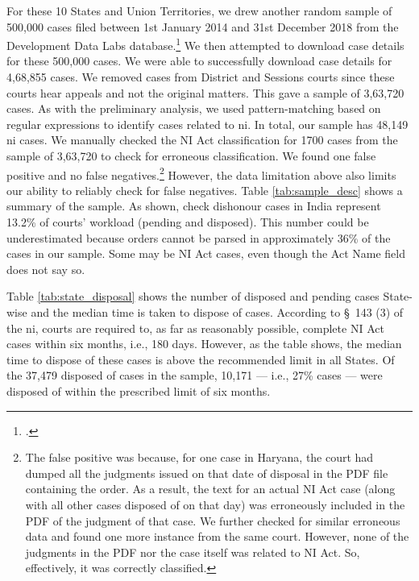 \documentclass[12pt,a4paper]{article}
\begin{document}
For these 10 States and Union Territories, we drew another random sample of 500,000 cases filed between 1st January 2014 and 31st December 2018 from the Development Data Labs database.\footcite{devdatalabs2021_eCourtsData} We then attempted to download case details for these 500,000 cases. We were able to successfully download case details for 4,68,855 cases. We removed cases from District and Sessions courts since these courts hear appeals and not the original matters. This gave a sample of 3,63,720 cases. As with the preliminary analysis, we used pattern-matching based on regular expressions to identify cases related to \gls{ni}. In total, our sample has 48,149 \gls{ni} cases. We manually checked the NI Act classification for 1700 cases from the sample of 3,63,720 to check for erroneous classification. We found one false positive and no false negatives.\footnote{The false positive was because, for one case in Haryana, the court had dumped all the judgments issued on that date of disposal in the PDF file containing the order. As a result, the text for an actual NI Act case (along with all other cases disposed of on that day) was erroneously included in the PDF of the judgment of that case. We further checked for similar erroneous data and found one more instance from the same court. However, none of the judgments in the PDF nor the case itself was related to NI Act. So, effectively, it was correctly classified.} However, the data limitation above also limits our ability to reliably check for false negatives. Table \ref{tab:sample_desc} shows a summary of the sample. As shown, check dishonour cases in India represent 13.2\% of courts' workload (pending and disposed). This number could be underestimated because orders cannot be parsed in approximately 36\% of the cases in our sample. Some may be NI Act cases, even though the Act Name field does not say so.

Table \ref{tab:state_disposal} shows the number of disposed and pending cases State-wise and the median time is taken to dispose of cases. According to \S~143 (3) of the \gls{ni}, courts are required to, as far as reasonably possible, complete NI Act cases within six months, i.e., 180 days. However, as the table shows, the median time to dispose of these cases is above the recommended limit in all States. Of the 37,479 disposed of cases in the sample, 10,171 --- i.e., 27\% cases --- were disposed of within the prescribed limit of six months.
\end{document}
